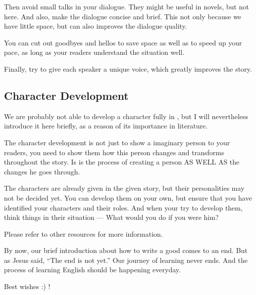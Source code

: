 Then avoid small talks in your dialogue. They might be useful in novels, but not 
here. And also, make the dialogue concise and brief. This not only because we have 
little space, but can also improves the dialogue quality.

You can cut out goodbyes and hellos to save space as well as to speed up your 
pace, as long as your readers understand the situation well.

Finally, try to give each speaker a unique voice, which greatly improves the 
story.

\subsection{Character Development}
We are probably not able to develop a character fully in \DHXX , but I will 
nevertheless introduce it here briefly, as a reason of its importance in 
literature.

The character development is not just to show a imaginary person to your readers, 
you need to show them how this person changes and transforms throughout the story. 
Is is the process of creating a person AS WELL AS the changes he goes through.

The characters are already given in the given story, but their personalities may 
not be decided yet. You can develop them on your own, but ensure that you have 
identified your characters and their roles. And when your try to develop them, 
think things in their situation --- What would you do if you were him?

Please refer to other resources for more information.

By now, our brief introduction about how to write a good \DHXX{} comes to an end.
But as Jesus said, ``The end is not yet.'' Our journey of learning never ends. And 
the process of learning English should be happening everyday.

Best wishes :) !